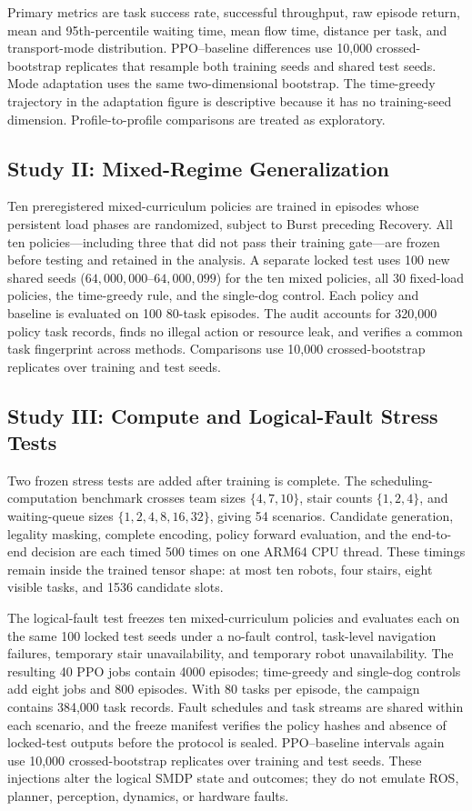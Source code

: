 \documentclass[journal]{IEEEtran}
\begin{document}
Primary metrics are task success rate, successful throughput, raw episode return, mean and 95th-percentile waiting time, mean flow time, distance per task, and transport-mode distribution. PPO--baseline differences use 10,000 crossed-bootstrap replicates that resample both training seeds and shared test seeds. Mode adaptation uses the same two-dimensional bootstrap. The time-greedy trajectory in the adaptation figure is descriptive because it has no training-seed dimension. Profile-to-profile comparisons are treated as exploratory.

\subsection{Study II: Mixed-Regime Generalization}

Ten preregistered mixed-curriculum policies are trained in episodes whose persistent load phases are randomized, subject to Burst preceding Recovery. All ten policies---including three that did not pass their training gate---are frozen before testing and retained in the analysis. A separate locked test uses 100 new shared seeds ($64{,}000{,}000$--$64{,}000{,}099$) for the ten mixed policies, all 30 fixed-load policies, the time-greedy rule, and the single-dog control. Each policy and baseline is evaluated on 100 80-task episodes. The audit accounts for 320,000 policy task records, finds no illegal action or resource leak, and verifies a common task fingerprint across methods. Comparisons use 10,000 crossed-bootstrap replicates over training and test seeds.

\subsection{Study III: Compute and Logical-Fault Stress Tests}

Two frozen stress tests are added after training is complete. The scheduling-computation benchmark crosses team sizes $\{4,7,10\}$, stair counts $\{1,2,4\}$, and waiting-queue sizes $\{1,2,4,8,16,32\}$, giving 54 scenarios. Candidate generation, legality masking, complete encoding, policy forward evaluation, and the end-to-end decision are each timed 500 times on one ARM64 CPU thread. These timings remain inside the trained tensor shape: at most ten robots, four stairs, eight visible tasks, and 1536 candidate slots.

The logical-fault test freezes ten mixed-curriculum policies and evaluates each on the same 100 locked test seeds under a no-fault control, task-level navigation failures, temporary stair unavailability, and temporary robot unavailability. The resulting 40 PPO jobs contain 4000 episodes; time-greedy and single-dog controls add eight jobs and 800 episodes. With 80 tasks per episode, the campaign contains 384,000 task records. Fault schedules and task streams are shared within each scenario, and the freeze manifest verifies the policy hashes and absence of locked-test outputs before the protocol is sealed. PPO--baseline intervals again use 10,000 crossed-bootstrap replicates over training and test seeds. These injections alter the logical SMDP state and outcomes; they do not emulate ROS, planner, perception, dynamics, or hardware faults.
\end{document}

